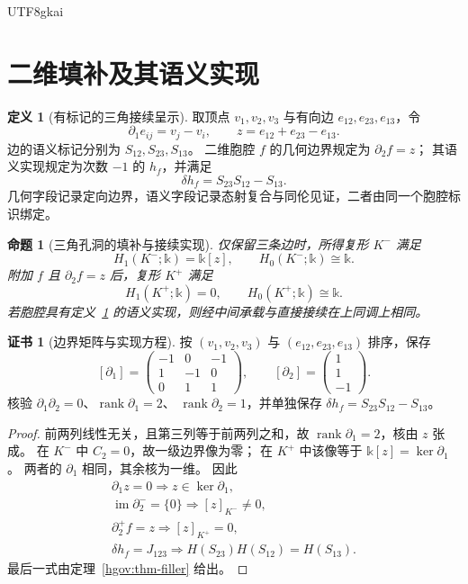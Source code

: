 \documentclass[12pt,a4paper,openany,notitlepage]{report}
\theoremstyle{plain}
\newtheorem{proposition}[theorem]{命题}
\theoremstyle{definition}
\newtheorem{definition}[theorem]{定义}
\newtheorem*{certificate}{证书}
\theoremstyle{remark}
\begin{document}
\begin{CJK*}{UTF8}{gkai}
\section{二维填补及其语义实现}
\label{hgov:two-cell}

\begin{definition}[有标记的三角接续呈示]
\label{hgov:def-triangle}
取顶点 $v_1,v_2,v_3$ 与有向边 $e_{12},e_{23},e_{13}$，令
\[
 \partial_1e_{ij}=v_j-v_i,\qquad
 z=e_{12}+e_{23}-e_{13}.
\]
边的语义标记分别为 $S_{12},S_{23},S_{13}$。
二维胞腔 $f$ 的几何边界规定为 $\partial_2f=z$；
其语义实现规定为次数 $-1$ 的 $h_f$，并满足
\[
 \delta h_f=S_{23}S_{12}-S_{13}.
\]
几何字段记录定向边界，语义字段记录态射复合与同伦见证，二者由同一个胞腔标识绑定。
\end{definition}

\begin{proposition}[三角孔洞的填补与接续实现]
\label{hgov:prop-triangle}
仅保留三条边时，所得复形 $K^-$ 满足
\[
 H_1(K^-;\mathbb k)=\mathbb k[z],\qquad
 H_0(K^-;\mathbb k)\cong\mathbb k.
\]
附加 $f$ 且 $\partial_2f=z$ 后，复形 $K^+$ 满足
\[
 H_1(K^+;\mathbb k)=0,\qquad
 H_0(K^+;\mathbb k)\cong\mathbb k.
\]
若胞腔具有定义~\ref{hgov:def-triangle} 的语义实现，则经中间承载与直接接续在上同调上相同。
\end{proposition}
\begin{certificate}[边界矩阵与实现方程]
按 $(v_1,v_2,v_3)$ 与 $(e_{12},e_{23},e_{13})$ 排序，保存
\[
 [\partial_1]=
 \begin{pmatrix}-1&0&-1\\1&-1&0\\0&1&1\end{pmatrix},
 \qquad
 [\partial_2]=\begin{pmatrix}1\\1\\-1\end{pmatrix}.
\]
核验 $\partial_1\partial_2=0$、$\operatorname{rank}\partial_1=2$、
$\operatorname{rank}\partial_2=1$，并单独保存
$\delta h_f=S_{23}S_{12}-S_{13}$。
\end{certificate}
\begin{proof}
前两列线性无关，且第三列等于前两列之和，故
$\operatorname{rank}\partial_1=2$，核由 $z$ 张成。
在 $K^-$ 中 $C_2=0$，故一级边界像为零；
在 $K^+$ 中该像等于 $\mathbb k[z]=\ker\partial_1$。
两者的 $\partial_1$ 相同，其余核为一维。
因此
\[
 \begin{gathered}
 \partial_1z=0
 \Longrightarrow z\in\ker\partial_1,\\
 \operatorname{im}\partial_2^-=\{0\}
 \Longrightarrow[z]_{K^-}\ne0,\\
 \partial_2^+f=z
 \Longrightarrow[z]_{K^+}=0,\\
 \delta h_f=J_{123}
 \Longrightarrow H(S_{23})H(S_{12})=H(S_{13}).
 \end{gathered}
\]
最后一式由定理~\ref{hgov:thm-filler} 给出。
\end{proof}


\end{CJK*}
\end{document}

